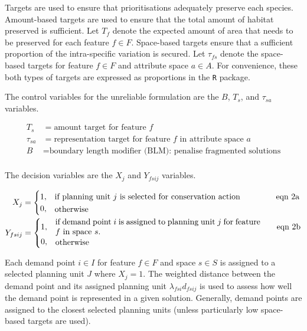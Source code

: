 \documentclass[11pt,]{article}
\begin{document}
Targets are used to ensure that prioritisations adequately preserve each
species. Amount-based targets are used to ensure that the total amount
of habitat preserved is sufficient. Let $T_f$ denote the expected amount
of area that needs to be preserved for each feature $f \in F$.
Space-based targets ensure that a sufficient proportion of the
intra-specific variation is secured. Let $\tau_{fs}$ denote the
space-based targets for feature $f \in F$ and attribute space $a \in A$.
For convenience, these both types of targets are expressed as
proportions in the \texttt{R} package.

The control variables for the unreliable formulation are the $B$,
$T_{s}$, and $\tau_{sa}$ variables.

\begin{align*}
T_s &= \text{amount target for feature $f$} \tag*{eqn 1a}\\
%
\tau_{sa} &= \text{representation target for feature $f$ in attribute space $a$} \tag*{eqn 1b}\\
%
B &= \text{boundary length modifier (BLM): penalise fragmented solutions} \tag*{eqn 1c}\\
\end{align*}

The decision variables are the $X_j$ and $Y_{fsij}$ variables.

\begin{align*}
X_j
    &= \begin{cases}
        1, & \parbox{25em}{if planning unit $j$ is selected for conservation action} \tag*{eqn 2a} \\
        0, & \parbox{25em}{otherwise} \\
    \end{cases} \\
%
Y_{fsij} &= \begin{cases}
        1, & \parbox{25em}{if demand point $i$ is assigned to planning unit $j$ for feature $f$ in space $s$. } \tag*{eqn 2b} \\
        0, & \parbox{25em}{otherwise} \\
    \end{cases} \\
\end{align*}

Each demand point $i \in I$ for feature $f \in F$ and space $s \in S$ is
assigned to a selected planning unit $J$ where $X_j = 1$. The weighted
distance between the demand point and its assigned planning unit
$\lambda_{fsi} d_{fsij}$ is used to assess how well the demand point is
represented in a given solution. Generally, demand points are assigned
to the closest selected planning units (unless particularly low
space-based targets are used).
\end{document}
